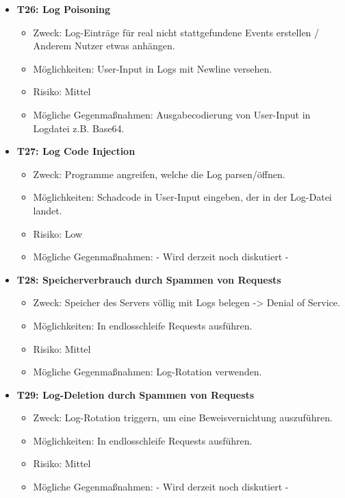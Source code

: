 \documentclass[12pt,DIV14,BCOR10mm,a4paper,parskip=half-,headsepline,headinclude,english,ngerman,bibliography=totocnumbered]{scrreprt}
\begin{document}
\begin{itemize}

  \hypertarget{threat26}{}
  \item \textbf{T26: Log Poisoning}
  \begin{itemize}
  \item Zweck: Log-Einträge für real nicht stattgefundene Events erstellen / Anderem Nutzer etwas anhängen.
  \item Möglichkeiten: User-Input in Logs mit Newline versehen.
  \item Risiko: Mittel
  \item Mögliche Gegenmaßnahmen: Ausgabecodierung von User-Input in Logdatei z.B. Base64.
  \end{itemize}

  \hypertarget{threat27}{}
  \item \textbf{T27: Log Code Injection}
  \begin{itemize}
  \item Zweck: Programme angreifen, welche die Log parsen/öffnen.
  \item Möglichkeiten: Schadcode in User-Input eingeben, der in der Log-Datei landet.
  \item Risiko: Low
  \item Mögliche Gegenmaßnahmen: - Wird derzeit noch diskutiert -
  \end{itemize}

  \hypertarget{threat28}{}
  \item \textbf{T28: Speicherverbrauch durch Spammen von Requests}
  \begin{itemize}
  \item Zweck: Speicher des Servers völlig mit Logs belegen -> Denial of Service.
  \item Möglichkeiten: In endlosschleife Requests ausführen.
  \item Risiko: Mittel
  \item Mögliche Gegenmaßnahmen: Log-Rotation verwenden.
  \end{itemize}

  \hypertarget{threat29}{}
  \item \textbf{T29: Log-Deletion durch Spammen von Requests}
  \begin{itemize}
  \item Zweck: Log-Rotation triggern, um eine Beweisvernichtung auszuführen.
  \item Möglichkeiten: In endlosschleife Requests ausführen.
  \item Risiko: Mittel
  \item Mögliche Gegenmaßnahmen: - Wird derzeit noch diskutiert -
  \end{itemize}


\end{itemize}
\end{document}
